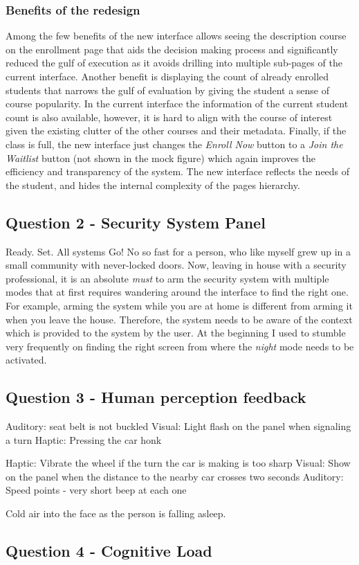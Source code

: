 \documentclass[12pt,letterpaper]{article}
\begin{document}
\subsubsection*{Benefits of the redesign}
Among the few benefits of the new interface allows seeing the description course on the enrollment page that aids the decision making process and significantly reduced the gulf of execution as it avoids drilling into multiple sub-pages of the current interface. Another benefit is displaying the count of already enrolled students that narrows the gulf of evaluation by giving the student a sense of course popularity. In the current interface the information of the current student count is also available, however, it is hard to align with the course of interest given the existing clutter of the other courses and their metadata. Finally, if the class is full, the new interface just changes the \textit{Enroll Now} button to a \textit{Join the Waitlist} button (not shown in the mock figure) which again improves the efficiency and transparency of the system. The new interface reflects the needs of the student, and hides the internal complexity of the pages hierarchy.  

\subsection*{Question 2 - Security System Panel}
Ready. Set. All systems Go! No so fast for a person, who like myself grew up in a small community with never-locked doors. Now, leaving in house with a security professional, it is an absolute \textit{must} to arm the security system with multiple modes that at first requires wandering around the interface to find the right one. For example, arming the system while you are at home is different from arming it when you leave the house. Therefore, the system needs to be aware of the context which is provided to the system by the user. At the beginning I used to stumble very frequently on finding the right screen from where the \textit{night} mode needs to be activated. 

\subsection*{Question 3 - Human perception feedback}

Auditory: seat belt is not buckled  
Visual: Light flash on the panel when signaling a turn 
Haptic: Pressing the car honk

Haptic: Vibrate the wheel if the turn the car is making is too sharp
Visual: Show on the panel when the distance to the nearby car crosses two seconds
Auditory: Speed points - very short beep at each one

Cold air into the face as the person is falling asleep.

\subsection*{Question 4 - Cognitive Load}

 

\end{document}
